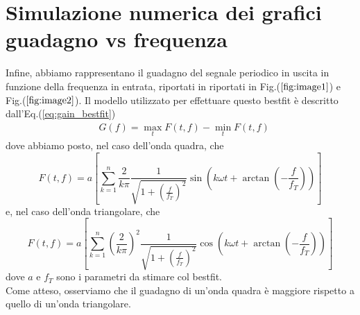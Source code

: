 \documentclass{article}
\begin{document}
\section{Simulazione numerica dei grafici guadagno vs frequenza}
    Infine, abbiamo rappresentano il guadagno del segnale periodico in uscita in funzione della frequenza in entrata, riportati in riportati in Fig.($\ref{fig:image1}$) e Fig.($\ref{fig:image2}$). Il modello utilizzato per effettuare questo bestfit è descritto dall'Eq.(\ref{eq:gain_bestfit})
    \begin{align}
        &G(f) = \max_{t}{F(t, f)} - \min_{t}{F(t, f)}
        \label{eq:gain_bestfit}
    \end{align}
    dove abbiamo posto, nel caso dell'onda quadra, che
    $$
    F(t, f) = a \left[\sum_{k=1}^n \frac{2}{k\pi} \frac{1}{\sqrt{1 + \left( \frac{f}{f_T} \right)^2}} \sin{\left(k\omega t + \arctan{\left(-\frac{f}{f_T}\right)} \right)}\right]
    $$
    e, nel caso dell'onda triangolare, che
    $$
    F(t, f) = a \left[\sum_{k=1}^n \left( \frac{2}{k\pi} \right)^2 \frac{1}{\sqrt{1 + \left( \frac{f}{f_T} \right)^2}} \cos{\left( k\omega t + \arctan{\left(-\frac{f}{f_T}\right)} \right)}\right]
    $$
    dove $a$ e $f_T$ sono i parametri da stimare col bestfit. \\
    Come atteso, osserviamo che il guadagno di un'onda quadra è maggiore rispetto a quello di un'onda triangolare. 
\end{document}
